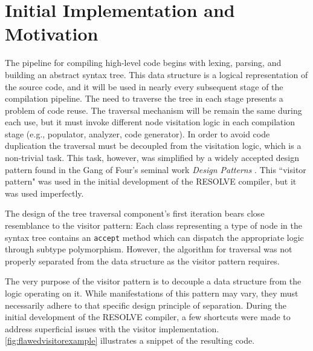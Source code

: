 \documentclass[times]{speauth}
\begin{document}

\section{Initial Implementation and Motivation}
The pipeline for compiling high-level code begins with lexing, parsing, and building an abstract syntax tree. This data structure is a logical representation of the source code, and it will be used in nearly every subsequent stage of the compilation pipeline. The need to traverse the tree in each stage presents a problem of code reuse. The traversal mechanism will be remain the same during each use, but it must invoke different node visitation logic in each compilation stage (e.g., populator, analyzer, code generator). In order to avoid code duplication the traversal must be decoupled from the visitation logic, which is a non-trivial task. This task, however, was simplified by a widely accepted design pattern found in the Gang of Four's seminal work \textit{Design Patterns} \cite{gamma:1995}. This ``visitor pattern" was used in the initial development of the RESOLVE compiler, but it was used imperfectly.

The design of the tree traversal component's first iteration bears close resemblance to the visitor pattern: Each class representing a type of node in the syntax tree contains an \texttt{accept} method which can dispatch the appropriate logic through subtype polymorphism. However, the algorithm for traversal was not properly separated from the data structure as the visitor pattern requires.

The very purpose of the visitor pattern is to decouple a data structure from the logic operating on it. While manifestations of this pattern may vary, they must necessarily adhere to that specific design principle of separation. During the initial development of the RESOLVE compiler, a few shortcuts were made to address superficial issues with the visitor implementation. \ref{fig:flawedvisitorexample} illustrates a snippet of the resulting code.
\end{document}
